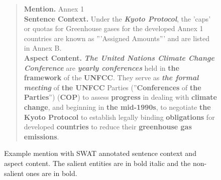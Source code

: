 \begin{figure}[t]
   \centering
   \begin{quote}
   \textbf{Mention.} Annex 1 \\
   
   \textbf{Sentence Context.} Under the \textit{\textbf{Kyoto Protocol}}, the 'caps' or quotas for Greenhouse gases for the developed Annex 1 countries are known as '''Assigned Amounts''' and are listed in Annex B. \\
   
   \textbf{Aspect Content.} \textit{\textbf{The United Nations Climate Change Conference}} are \textit{\textbf{yearly conferences}} held in \textbf{the framework} of the \textbf{UNFCC}. They serve as \textit{\textbf{the formal meeting}} of \textbf{the UNFCC} Parties (''\textbf{Conferences} of \textbf{the Parties}'') (\textbf{COP}) to assess \textbf{progress} in dealing with \textbf{climate change}, and beginning in \textbf{the mid-1990s}, to negotiate \textbf{the Kyoto Protocol} to establish legally binding \textbf{obligations} for developed \textbf{countries} to reduce their \textbf{greenhouse gas emissions}.

\end{quote}
    \caption{Example mention with SWAT annotated sentence context and aspect content. The salient entities are in bold italic and the non-salient ones are in bold.}
    \label{fig:Salience-Example}
\end{figure}